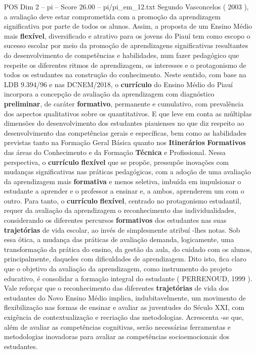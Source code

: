 \begin{textsample}{POS Dim 2 – pi – Score 26.00 – pi/pi\_em\_12.txt}
Segundo Vasconcelos ( 2003 ), a avaliação deve estar comprometida com a promoção da aprendizagem significativa por parte de todos os alunos.
Assim, a proposta de um Ensino Médio mais \textbf{flexível}, diversificado e atrativo para os jovens do Piauí tem como escopo o sucesso escolar por meio da promoção de aprendizagens significativas resultantes do desenvolvimento de competências e habilidades, num fazer pedagógico que respeite os diferentes ritmos de aprendizagem, os interesses e o protagonismo de todos os estudantes na construção do conhecimento.
Neste sentido, com base na LDB 9.394/96 e nas DCNEM/2018, o \textbf{currículo} do Ensino Médio do Piauí incorpora a concepção de avaliação da aprendizagem com diagnóstico \textbf{preliminar}, de caráter \textbf{formativo}, permanente e cumulativo, com prevalência dos aspectos qualitativos sobre os quantitativos.
E que leve em conta as múltiplas dimensões do desenvolvimento dos estudantes piauienses no que diz respeito ao desenvolvimento das competências gerais e específicas, bem como as habilidades previstas tanto na Formação Geral Básica quanto nos \textbf{Itinerários} \textbf{Formativos} das áreas do Conhecimento e da Formação \textbf{Técnica} e Profissional.
Nessa perspectiva, o \textbf{currículo} \textbf{flexível} que se propõe, pressupõe inovações com mudanças significativas nas práticas pedagógicas, com a adoção de uma avaliação da aprendizagem mais \textbf{formativa} e menos seletiva, imbuída em impulsionar o estudante a aprender e o professor a ensinar e, a ambos, aprenderem um com o outro.
Para tanto, o \textbf{currículo} \textbf{flexível}, centrado no protagonismo estudantil, requer da avaliação da aprendizagem o reconhecimento das individualidades, considerando os diferentes percursos \textbf{formativos} dos estudantes nas suas \textbf{trajetórias} de vida escolar, ao invés de simplesmente atribuí -lhes notas.
Sob essa ótica, a mudança das práticas de avaliação demanda, logicamente, uma transformação da prática do ensino, da gestão da aula, do cuidado com os alunos, principalmente, daqueles com dificuldades de aprendizagem.
Dito isto, fica claro que o objetivo da avaliação da aprendizagem, como instrumento do projeto educativo, é consolidar a formação integral do estudante ( PERRENOUD, 1999 ).
Vale reforçar que o reconhecimento das diferentes \textbf{trajetórias} de vida dos estudantes do Novo Ensino Médio implica, indubitavelmente, um movimento de flexibilização nas formas de ensinar e avaliar as juventudes do Século XXI, com exigência de contextualização e recriação das metodologias.
Acrescenta -se que, além de avaliar as competências cognitivas, serão necessárias ferramentas e metodologias inovadoras para avaliar as competências socioemocionais dos estudantes.

\end{textsample}
